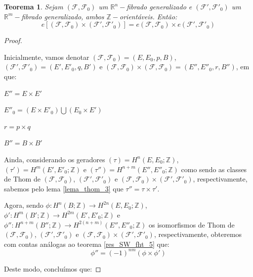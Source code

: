 \documentclass[12pt,oneside]{book} %
\newtheorem{teo}    {\hspace{0.5cm}Teorema}[chapter]
\newcommand{\R}{\mathbb{R}}
\newcommand{\Z}{\mathbb{Z}}
\begin{document}
\begin{teo}\label{euler_prod}
	Sejam $(\mathcal{F},\mathcal{F}_{0})$ um $\R^{n}-$fibrado generalizado e $(\mathcal{F'},\mathcal{F'}_{0})$ um $\R^{m}-$fibrado generalizado, ambos $\Z-$orientáveis. Então:
	$$ e[(\mathcal{F},\mathcal{F}_{0})\times (\mathcal{F'},\mathcal{F'}_{0})]=e(\mathcal{F},\mathcal{F}_{0})\times e(\mathcal{F'},\mathcal{F'}_{0}) $$
\end{teo}
\begin{proof}
	
	\
	
	\par Inicialmente, vamos denotar $(\mathcal{F},\mathcal{F}_{0})=(E,E_{0},p,B)$, $(\mathcal{F'},\mathcal{F'}_{0})=(E',E'_{0},q,B')$ e $(\mathcal{F},\mathcal{F}_{0})\times (\mathcal{F},\mathcal{F}_{0})=(E'',E''_{0},r,B'')$, em que: \newline
	
	$E''=E\times E'$
	
	$E''_{0}=(E\times E'_{0})\bigcup (E_{0}\times E')$
	
	$r=p\times q$
	
	$B''=B\times B'$ \newline
	
	\par Ainda, considerando os geradores $(\tau)=H^{n}(E,E_{0};\Z)$, $(\tau')=H^{m}(E',E'_{0};\Z)$ e $(\tau'')=H^{n+m}(E'',E''_{0};\Z)$ como sendo as classes de Thom de $(\mathcal{F},\mathcal{F}_{0})$, $(\mathcal{F'},\mathcal{F'}_{0})$ e $(\mathcal{F},\mathcal{F}_{0})\times (\mathcal{F'},\mathcal{F'}_{0})$, respectivamente, sabemos pelo lema \ref{lema_thom_3} que $\tau''=\tau\times\tau'$.
	
	\par Agora, sendo $\phi:H^{n}(B;\Z)\to H^{2n}(E,E_{0};\Z)$, $\phi':H^{m}(B';\Z)\to H^{2m}(E',E'_{0};\Z)$ e $\phi'':H^{n+m}(B'';\Z)\to H^{2(n+m)}(E'',E''_{0};\Z)$ os isomorfismos de Thom de $(\mathcal{F},\mathcal{F}_{0})$, $(\mathcal{F'},\mathcal{F'}_{0})$ e $(\mathcal{F},\mathcal{F}_{0})\times (\mathcal{F'},\mathcal{F'}_{0})$, respectivamente, obteremos com contas análogas ao teorema \ref{res_SW_fht_5} que:
	$$ \phi''=(-1)^{nm}(\phi\times\phi') $$
	
	\par Deste modo, concluímos que: \newline
	

\end{proof}
\end{document}
